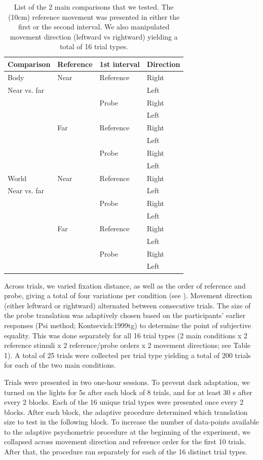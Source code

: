 \begin{table}
    \begin{tabular}{llll}
    Comparison & Reference & 1st interval & Direction \\
    \hline
    Body & Near & Reference & Right \\
    Near vs. far & & & Left \\    
    & & Probe & Right \\
    & & & Left \\
    \cline{2-4}
	& Far & Reference & Right \\
    & & & Left \\    
    & & Probe & Right \\
    & & & Left \\
    \hline
    World & Near & Reference & Right \\
    Near vs. far & & & Left \\    
    & & Probe & Right \\
    & & & Left \\
    \cline{2-4}
	& Far & Reference & Right \\
    & & & Left \\    
    & & Probe & Right \\
    & & & Left \\
    \end{tabular}

    \caption{List of the 2 main comparisons that we tested. The (10cm) reference movement was presented in either the first or the second interval. We also manipulated movement direction (leftward vs rightward) yielding a total of 16 trial types.}

    \label{p4:tab1}
\end{table}

Across trials, we varied fixation distance, as well as the order of reference and probe, giving a total of four variations per condition (see ). Movement direction (either leftward or rightward) alternated between consecutive trials. The size of the probe translation was adaptively chosen based on the participants' earlier responses (Psi method; {Kontsevich:1999tg}) to determine the point of subjective equality. This was done separately for all 16 trial types (2 main conditions x 2 reference stimuli x 2 reference/probe orders x 2 movement directions; see Table 1). A total of 25 trials were collected per trial type yielding a total of 200 trials for each of the two main conditions.

Trials were presented in two one-hour sessions. To prevent dark adaptation, we turned on the lights for 5s after each block of 8 trials, and for at least 30 s after every 2 blocks. Each of the 16 unique trial types were presented once every 2 blocks. After each block, the adaptive procedure determined which translation size to test in the following block. To increase the number of data-points available to the adaptive psychometric procedure at the beginning of the experiment, we collapsed across movement direction and reference order for the first 10 trials. After that, the procedure ran separately for each of the 16 distinct trial types.

